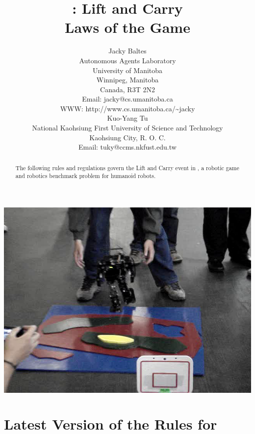 \documentclass[12pt]{hurocup}
\begin{document}
\title{\HuroCup: Lift and Carry\\
  Laws of the Game \thisyear}

\author{Jacky Baltes\\
Autonomous Agents Laboratory\\
University of Manitoba\\
Winnipeg, Manitoba\\
Canada, R3T 2N2\\
Email: jacky@cs.umanitoba.ca\\
WWW: http://www.cs.umanitoba.ca/\~{ }jacky\\[5mm]
Kuo-Yang Tu\\
National Kaohsiung First University of Science and Technology\\
Kaohsiung City, R. O. C.\\
Email: tuky@ccms.nkfust.edu.tw\\
}

\maketitle

\begin{center}
 \includegraphics[width=0.7\linewidth]{Figures/lift-and-carry-life}
\end{center}

\begin{abstract}
The following rules and regulations govern the Lift and Carry event in
\HuroCup, a robotic game and robotics benchmark problem for humanoid
robots.
%
\end{abstract}

\section*{Latest Version of the Rules for \HuroCup}
\label{sec:updates}
\end{document}
